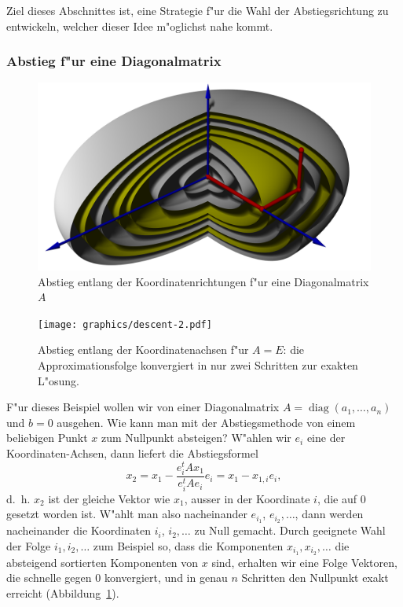 Ziel dieses Abschnittes ist, eine Strategie f"ur die Wahl der 
Abstiegsrichtung zu entwickeln, welcher dieser Idee m"oglichst nahe kommt.

\subsubsection{Abstieg f"ur eine Diagonalmatrix}
\begin{figure}
\includegraphics[width=\hsize]{graphics/descent3d.jpg}
\caption{Abstieg entlang der Koordinatenrichtungen f"ur eine Diagonalmatrix
$A$
\label{descent3d}}
\end{figure}
\begin{figure}
\begin{center}
\texttt{[image: graphics/descent-2.pdf]}
\end{center}
\caption{Abstieg entlang der Koordinatenachsen f"ur $A=E$:
die Approximationsfolge konvergiert in nur zwei Schritten zur exakten
L"osung.
\label{descent:exact}}
\end{figure}
F"ur dieses Beispiel wollen wir von einer Diagonalmatrix
$A=\operatorname{diag}(a_1,\dots,a_n)$ und $b=0$ ausgehen.
Wie kann man mit der Abstiegsmethode von einem beliebigen Punkt $x$
zum Nullpunkt absteigen?
W"ahlen wir $e_i$ eine der Koordinaten-Achsen, dann liefert die
Abstiegsformel
\[
x_2=x_1-\frac{e_i^tAx_1}{e_i^tAe_i}e_i
=x_1-x_{1,i}e_i,
\]
d.~h. $x_2$ ist der gleiche Vektor wie $x_1$, ausser in der Koordinate $i$,
die auf $0$ gesetzt worden ist.
W"ahlt man also nacheinander $e_{i_1}$, $e_{i_2},\dots$, dann werden
nacheinander die Koordinaten $i_i$, $i_2,\dots$ zu Null gemacht.
Durch geeignete Wahl der Folge $i_1,i_2,\dots$ zum Beispiel so,
dass die Komponenten $x_{i_1},x_{i_2},\dots$ die absteigend sortierten
Komponenten von $x$ sind, erhalten wir eine Folge Vektoren, die schnelle
gegen $0$ konvergiert, und in genau $n$ Schritten den Nullpunkt exakt
erreicht (Abbildung~\ref{descent3d}).

